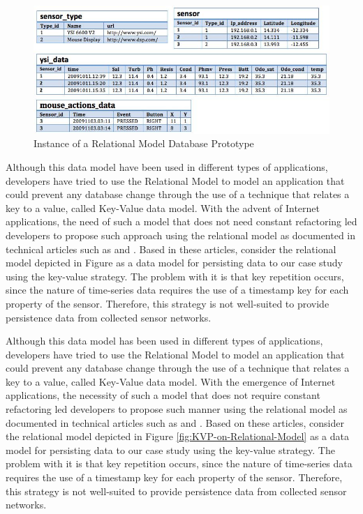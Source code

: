 \begin{figure}[!h]
  \centering
  \includegraphics[scale=0.7]{../diagrams/persistence-example-relational}
  \caption{Instance of a Relational Model Database Prototype}
  \label{fig:persistence-example-relational}
\end{figure}

Although this data model have been used in different types of applications,
developers have tried to use the Relational Model to model an application that
could prevent any database change through the use of a technique that relates a
key to a value, called Key-Value data model. With the advent of Internet
applications, the need of such a model that does not need constant refactoring
led developers to propose such approach using the relational model as
documented in technical articles such as  and
. Based in these articles, consider the relational
model depicted in Figure  as a data model for
persisting data to our case study using the key-value strategy. The problem
with it is that key repetition occurs, since the nature of time-series data
requires the use of a timestamp key for each property of the sensor. Therefore,
this strategy is not well-suited to provide persistence data from collected
sensor networks.

Although this data model has been used in different types of applications,
developers have tried to use the Relational Model to model an application that
could prevent any database change through the use of a technique that relates a
key to a value, called Key-Value data model. With the emergence of Internet
applications, the necessity of such a model that does not require constant
refactoring led developers to propose such manner using the relational model as
documented in technical articles such as \cite{db-kvp-in-relational01} and
\cite{db-kvp-in-relational02}. Based on these articles, consider the
relational model depicted in Figure \ref{fig:KVP-on-Relational-Model} as a
data model for persisting data to our case study using the key-value strategy.
The problem with it is that key repetition occurs, since the nature of
time-series data requires the use of a timestamp key for each property of the
sensor. Therefore, this strategy is not well-suited to provide persistence
data from collected sensor networks.

